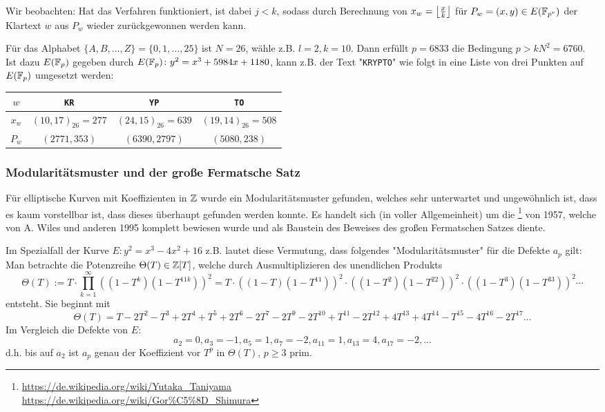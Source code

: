 \begin{bem}
	Wir beobachten: Hat das Verfahren funktioniert, ist dabei $j < k$, sodass durch Berechnung von $x_w = \floor*{\frac{x}{k}}$ für $P_w=(x,y) \in E(\FF_{p^r})$ der Klartext $w$ aus $P_w$ wieder zurückgewonnen werden kann.
\end{bem}

\begin{bsp}
	Für das Alphabet $\{A,B,\dots,Z\} = \{0,1,\dots,25\}$ ist $N = 26$, wähle z.B. $l = 2, k=10$.
	Dann erfüllt $p=6833$ die Bedingung $p > kN^2 = 6760$.
	Ist dazu $E(\FF_p)$ gegeben durch $E(\FF_p)\colon y^2 = x^3 + 5984x + 1180$, kann z.B. der Text "\texttt{KRYPTO}" wie folgt in eine Liste von drei Punkten auf $E(\FF_p)$ umgesetzt werden:
	\begin{center}
		\begin{tabular}{c||c|c|c}
		$w$ & \texttt{KR} & \texttt{YP} & \texttt{TO} \\ 
		\hline $x_w$ & $(10,17)_{26} = 277$ & $(24,15)_{26} = 639$ & $(19,14)_{26} = 508$ \\ 
		\hline $P_w$ & $(2771,353)$ & $(6390,2797)$ & $(5080,238)$
		\end{tabular} 
	\end{center}
\end{bsp}

\nextlecture
\subsubsection{Modularitätsmuster und der große Fermatsche Satz}
\label{subsub:3.3.2}
\begin{bem}
	Für elliptische Kurven mit Koeffizienten in $\ZZ$ wurde ein Modularitätsmuster gefunden,\marginnote{[18]} welches sehr unterwartet und ungewöhnlich ist, dass es kaum vorstellbar ist, dass dieses überhaupt gefunden werden konnte.
	Es handelt sich (in voller Allgemeinheit) um die \footnote{\url{https://de.wikipedia.org/wiki/Yutaka_Taniyama} \\ \url{https://de.wikipedia.org/wiki/Gor\%C5\%8D_Shimura}} von 1957, welche von A. Wiles und anderen 1995 komplett bewiesen wurde und als Baustein des Beweises des großen Fermatschen Satzes diente.
\end{bem}

\begin{bsp}
	Im Spezialfall der Kurve $E\colon y^2 = x^3 - 4x^2 + 16$ z.B. lautet diese Vermutung, dass folgendes "Modularitätsmuster" für die Defekte $a_p$ gilt: \\
	Man betrachte die Potenzreihe $\Theta(T) \in \ZZ[T]$, welche durch Ausmultiplizieren des unendlichen Produkts
	\[
		\Theta(T) := T \cdot \prod_{k=1}^{\infty} ((1-T^k)(1-T^{11k}))^2 = T \cdot ((1-T)(1-T^{11}))^2 \cdot ((1-T^2)(1-T^{22}))^2 \cdot ((1-T^3)(1-T^{33}))^2 \cdots
	\]
	entsteht.
	Sie beginnt mit
	\[
		\Theta(T) = T - 2T^2 - T^3 + 2T^4 + T^5 + 2T^6 - 2T^7 - 2T^9 - 2T^{10} + T^{11} - 2T^{12} + 4T^{13} + 4T^{14} - T^{15} - 4T^{16} - 2T^{17} \dots
	\]
	Im Vergleich die Defekte von $E$:
	\[
		a_2 = 0, a_3 = -1, a_5 = 1, a_7 = -2, a_{11} = 1, a_{13} = 4, a_{17} = -2, \dots
	\]
	d.h. bis auf $a_2$ ist $a_p$ genau der Koeffizient vor $T^p$ in $\Theta(T)$, $p \geq 3$ prim.
\end{bsp}

